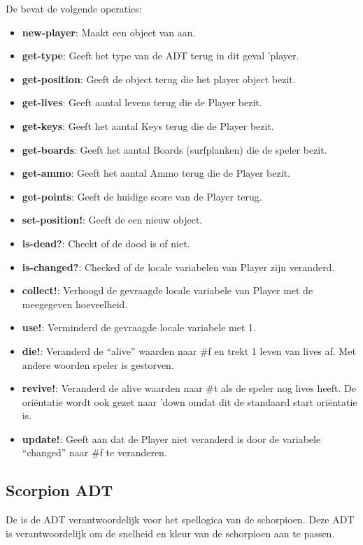 De \texttt{} bevat de volgende operaties:

\begin{itemize}
	\item \textbf{new-player}: Maakt een object van \texttt{} aan.
	\item \textbf{get-type}: Geeft het type van de ADT terug in dit geval 'player.
	\item \textbf{get-position}: Geeft de \texttt{} object terug die het player object bezit.
	\item \textbf{get-lives}: Geeft aantal levens terug die de Player bezit.
	\item \textbf{get-keys}: Geeft het aantal Keys terug die de Player bezit.
	\item \textbf{get-boards}: Geeft het aantal Boards (surfplanken) die de speler bezit.
	\item \textbf{get-ammo}: Geeft het aantal Ammo terug die de Player bezit.
	\item \textbf{get-points}: Geeft de huidige score van de Player terug.
	\item \textbf{set-position!}: Geeft de \texttt{} een nieuw \texttt{} object.
	\item \textbf{is-dead?}: Checkt of de \texttt{} dood is of niet.
	\item \textbf{is-changed?}: Checked of de locale variabelen van Player zijn veranderd.
	\item \textbf{collect!}: Verhoogd de gevraagde locale variabele van Player met de meegegeven hoeveelheid.
	\item \textbf{use!}: Verminderd de gevraagde locale variabele met 1.
	\item \textbf{die!}: Veranderd de ``alive'' waarden naar \#f
		en trekt 1 leven van lives af.
		Met andere woorden speler is gestorven.
	\item \textbf{revive!}: Veranderd de alive waarden naar \#t als de speler nog lives heeft.
		De oriëntatie wordt ook gezet naar 'down omdat dit de standaard start oriëntatie is.
	\item \textbf{update!}: Geeft aan dat de Player niet veranderd is door de variabele ``changed'' naar \#f te veranderen.
\end{itemize}

\subsection{Scorpion ADT}
\label{section:scorpion}
De \texttt{} is de ADT verantwoordelijk voor het spellogica van de schorpioen. 
Deze ADT is verantwoordelijk om de snelheid en kleur van de schorpioen aan te passen.

